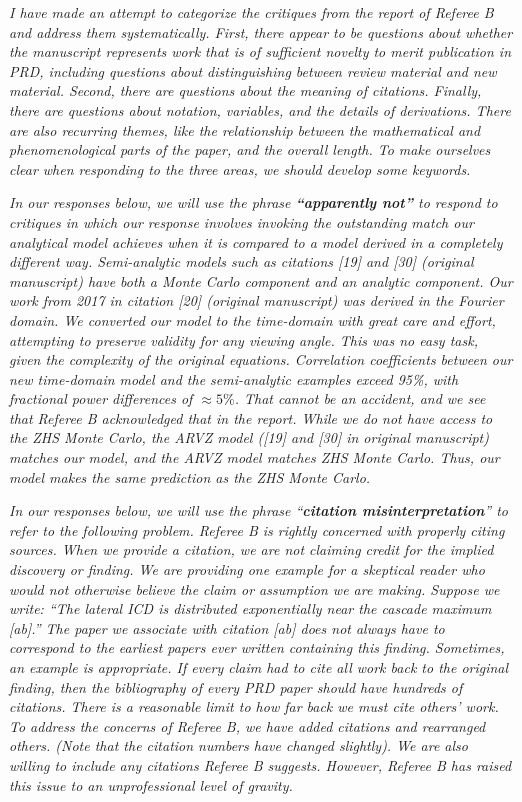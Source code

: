 \documentclass[12pt]{article}
\begin{document}
\textit{I have made an attempt to categorize the critiques from the report of Referee B and address them systematically.  First, there appear to be questions about whether the manuscript represents work that is of sufficient novelty to merit publication in PRD, including questions about distinguishing between review material and new material.  Second, there are questions about the meaning of citations.  Finally, there are questions about notation, variables, and the details of derivations.  There are also recurring themes, like the relationship between the mathematical and phenomenological parts of the paper, and the overall length.  To make ourselves clear when responding to the three areas, we should develop some keywords.}

\textit{In our responses below, we will use the phrase \textbf{``apparently not''} to respond to critiques in which our response involves invoking the outstanding match our analytical model achieves when it is compared to a model derived in a completely different way.  Semi-analytic models such as citations [19] and [30] (original manuscript) have both a Monte Carlo component and an analytic component.  Our work from 2017 in citation [20] (original manuscript) was derived in the Fourier domain.  We converted our model to the time-domain with great care and effort, attempting to preserve validity for any viewing angle.  This was no easy task, given the complexity of the original equations.  Correlation coefficients between our new time-domain model and the semi-analytic examples exceed 95\%, with fractional power differences of $\approx 5\%$.  That cannot be an accident, and we see that Referee B acknowledged that in the report.  While we do not have access to the ZHS Monte Carlo, the ARVZ model ([19] and [30] in original manuscript) matches our model, and the ARVZ model matches ZHS Monte Carlo.  Thus, our model makes the same prediction as the ZHS Monte Carlo.}

\textit{In our responses below, we will use the phrase ``\textbf{citation misinterpretation}'' to refer to the following problem.  Referee B is rightly concerned with properly citing sources.  When we provide a citation, we are not claiming credit for the implied discovery or finding.  We are providing one example for a skeptical reader who would not otherwise believe the claim or assumption we are making.  Suppose we write: ``The lateral ICD is distributed exponentially near the cascade maximum [ab].''  The paper we associate with citation [ab] does not always have to correspond to the earliest papers ever written containing this finding.  Sometimes, an example is appropriate.  If every claim had to cite all work back to the original finding, then the bibliography of every PRD paper should have hundreds of citations.  There is a reasonable limit to how far back we must cite others' work.  To address the concerns of Referee B, we have added citations and rearranged others.  (Note that the citation numbers have changed slightly).  We are also willing to include any citations Referee B suggests.  However, Referee B has raised this issue to an unprofessional level of gravity.} \\ 
\end{document}
